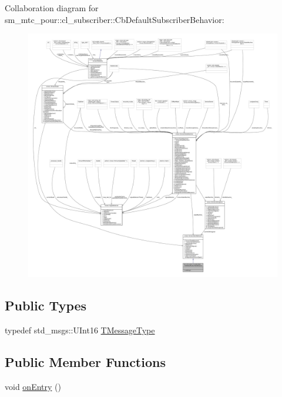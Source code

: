 Collaboration diagram for sm\+\_\+mtc\+\_\+pour\+:\+:cl\+\_\+subscriber\+:\+:Cb\+Default\+Subscriber\+Behavior\+:
\nopagebreak
\begin{figure}[H]
\begin{center}
\leavevmode
\includegraphics[width=350pt]{classsm__mtc__pour_1_1cl__subscriber_1_1CbDefaultSubscriberBehavior__coll__graph}
\end{center}
\end{figure}
\subsection*{Public Types}
\begin{DoxyCompactItemize}
\item 
typedef std\+\_\+msgs\+::\+U\+Int16 \hyperlink{classsm__mtc__pour_1_1cl__subscriber_1_1CbDefaultSubscriberBehavior_a4526207ce7f9ae3fb2a29d2a616470cd}{T\+Message\+Type}
\end{DoxyCompactItemize}
\subsection*{Public Member Functions}
\begin{DoxyCompactItemize}
\item 
void \hyperlink{classsm__mtc__pour_1_1cl__subscriber_1_1CbDefaultSubscriberBehavior_ae575334add7fbd93162d1af126612e13}{on\+Entry} ()
\end{DoxyCompactItemize}


